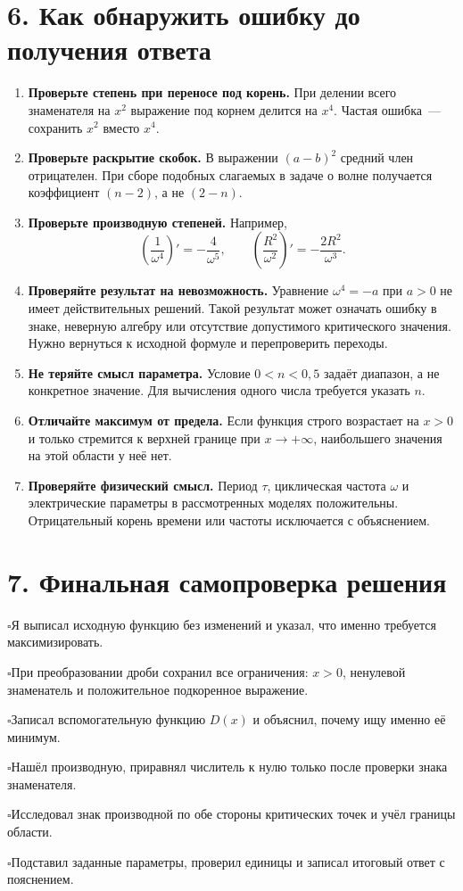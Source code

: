 \documentclass[a4paper,12pt]{article}
\newcommand{\key}[1]{\textcolor{darkaccent}{\textbf{#1}}}
\newcommand{\checkit}[1]{\par\noindent$\square$\enspace #1\par}
\begin{document}
\section*{6. Как обнаружить ошибку до получения ответа}
\begin{enumerate}[label=\arabic*.]
\item \key{Проверьте степень при переносе под корень.} При делении всего знаменателя на $x^2$ выражение под корнем делится на $x^4$. Частая ошибка~--- сохранить $x^2$ вместо $x^4$.
\item \key{Проверьте раскрытие скобок.} В выражении $(a-b)^2$ средний член отрицателен. При сборе подобных слагаемых в задаче о волне получается коэффициент $(n-2)$, а не $(2-n)$.
\item \key{Проверьте производную степеней.} Например,
\[
\left(\frac{1}{\omega^4}\right)'=-\frac{4}{\omega^5},
\qquad
\left(\frac{R^2}{\omega^2}\right)'=-\frac{2R^2}{\omega^3}.
\]
\item \key{Проверяйте результат на невозможность.} Уравнение $\omega^4=-a$ при $a>0$ не имеет действительных решений. Такой результат может означать ошибку в знаке, неверную алгебру или отсутствие допустимого критического значения. Нужно вернуться к исходной формуле и перепроверить переходы.
\item \key{Не теряйте смысл параметра.} Условие $0<n<0{,}5$ задаёт диапазон, а не конкретное значение. Для вычисления одного числа требуется указать $n$.
\item \key{Отличайте максимум от предела.} Если функция строго возрастает на $x>0$ и только стремится к верхней границе при $x\to+\infty$, наибольшего значения на этой области у неё нет.
\item \key{Проверяйте физический смысл.} Период $\tau$, циклическая частота $\omega$ и электрические параметры в рассмотренных моделях положительны. Отрицательный корень времени или частоты исключается с объяснением.
\end{enumerate}

\section*{7. Финальная самопроверка решения}
\checkit{Я выписал исходную функцию без изменений и указал, что именно требуется максимизировать.}
\checkit{При преобразовании дроби сохранил все ограничения: $x>0$, ненулевой знаменатель и положительное подкоренное выражение.}
\checkit{Записал вспомогательную функцию $D(x)$ и объяснил, почему ищу именно её минимум.}
\checkit{Нашёл производную, приравнял числитель к нулю только после проверки знака знаменателя.}
\checkit{Исследовал знак производной по обе стороны критических точек и учёл границы области.}
\checkit{Подставил заданные параметры, проверил единицы и записал итоговый ответ с пояснением.}
\end{document}
